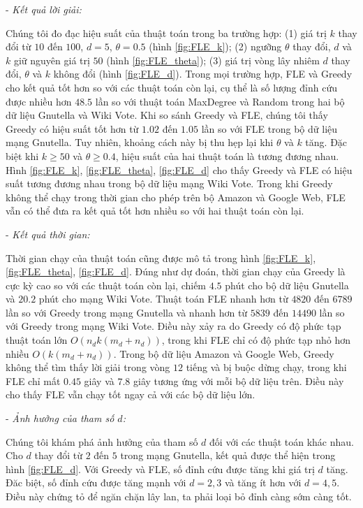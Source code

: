 - {\itshape Kết quả lời giải:}

Chúng tôi đo đạc hiệu suất của thuật toán trong ba trường hợp: (1) giá trị $k$ thay đổi từ $10$ đến $100$, $d=5$, $\theta=0.5$ (hình \ref{fig:FLE_k}); (2) ngưỡng $\theta$ thay đổi, $d$ và $k$ giữ nguyên giá trị $50$ (hình \ref{fig:FLE_theta}); (3) giá trị vòng lây nhiêm $d$ thay đổi, $\theta$ và $k$ không đổi (hình \ref{fig:FLE_d}). Trong mọi trường hợp, FLE và Greedy cho kết quả tốt hơn so với các thuật toán còn lại, cụ thể là số lượng đỉnh cứu được nhiều hơn $48.5$ lần so với thuật toán MaxDegree và Random trong hai bộ dữ liệu Gnutella và Wiki Vote. Khi so sánh Greedy và FLE, chúng tôi thấy Greedy có hiệu suất tốt hơn từ $1.02$ đến $1.05$ lần so với FLE trong bộ dữ liệu mạng Gnutella. Tuy nhiên, khoảng cách này bị thu hẹp lại khi $\theta$ và $k$ tăng. Đặc biệt khi $k \geq 50$ và $\theta \geq 0.4$, hiệu suất của hai thuật toán là tương đương nhau. Hình \ref{fig:FLE_k}, \ref{fig:FLE_theta}, \ref{fig:FLE_d} cho thấy Greedy và FLE có hiệu suất tương đương nhau trong bộ dữ liệu mạng Wiki Vote. Trong khi Greedy không thể chạy trong thời gian cho phép trên bộ Amazon và Google Web, FLE vẫn có thể đưa ra kết quả tốt hơn nhiều so với hai thuật toán còn lại.

- {\itshape Kết quả thời gian:}

Thời gian chạy của thuật toán cũng được mô tả trong hình \ref{fig:FLE_k}, \ref{fig:FLE_theta}, \ref{fig:FLE_d}. Đúng như dự đoán, thời gian chạy của Greedy là cực kỳ cao so với các thuật toán còn lại, chiếm $4.5$ phút cho bộ dữ liệu Gnutella và $20.2$ phút cho mạng Wiki Vote. Thuật toán FLE nhanh hơn từ $4820$ đến $6789$ lần so với Greedy trong mạng Gnutella và nhanh hơn từ $5839$ đến $14490$ lần so với Greedy trong mạng Wiki Vote. Điều này xảy ra do Greedy có độ phức tạp thuật toán lớn $O(n_{d}k(m_{d}+n_{d}))$, trong khi FLE chỉ có độ phức tạp nhỏ hơn nhiều $O(k(m_{d}+n_{d}))$. Trong bộ dữ liệu Amazon và Google Web, Greedy không thể tìm thấy lời giải trong vòng $12$ tiếng và bị buộc dừng chạy, trong khi FLE chỉ mất $0.45$ giây và $7.8$ giây tương ứng với mỗi bộ dữ liệu trên. Điều này cho thấy FLE vẫn chạy tốt ngay cả với các bộ dữ liệu lớn.

- {\itshape Ảnh hưởng của tham số $d$:}

Chúng tôi khám phá ảnh hưởng của tham số $d$ đối với các thuật toán khác nhau. Cho $d$ thay đổi từ $2$ đến $5$ trong mạng Gnutella, kết quả được thể hiện trong hình \ref{fig:FLE_d}. Với Greedy và FLE, số đỉnh cứu được tăng khi giá trị $d$ tăng. Đăc biệt, số đỉnh cứu được tăng mạnh với $d=2,3$ và tăng ít hơn với $d=4,5$. Điều này chứng tỏ để ngăn chặn lây lan, ta phải loại bỏ đỉnh càng sớm càng tốt.


